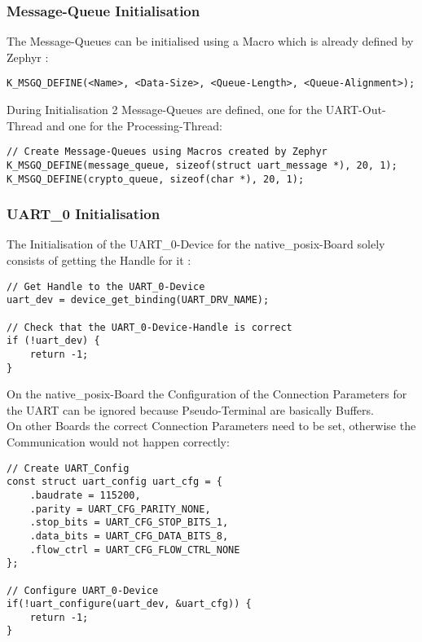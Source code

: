 \subsubsection{Message-Queue Initialisation}

The Message-Queues can be initialised using a Macro which
is already defined by Zephyr :
\\
\begin{lstlisting}[style=CStyle, caption=Message Queue Initialisation]
K_MSGQ_DEFINE(<Name>, <Data-Size>, <Queue-Length>, <Queue-Alignment>);
\end{lstlisting}
During Initialisation 2 Message-Queues are defined, one for
the UART-Out-Thread and one for the Processing-Thread:
\\
\begin{lstlisting}[style=CStyle]
// Create Message-Queues using Macros created by Zephyr
K_MSGQ_DEFINE(message_queue, sizeof(struct uart_message *), 20, 1);
K_MSGQ_DEFINE(crypto_queue, sizeof(char *), 20, 1);
\end{lstlisting}

\subsubsection{UART\_0 Initialisation}

The Initialisation of the UART\_0-Device for the native\_posix-Board
solely consists of getting the Handle for it :
\\
\begin{lstlisting}[style=CStyle,caption=UART 0 Initialisation]
// Get Handle to the UART_0-Device
uart_dev = device_get_binding(UART_DRV_NAME);

// Check that the UART_0-Device-Handle is correct
if (!uart_dev) {
	return -1;
}
\end{lstlisting}

\pagebreak

On the native\_posix-Board the Configuration of the Connection Parameters
for the UART can be ignored because Pseudo-Terminal are basically Buffers.
\\
On other Boards the correct Connection Parameters need to be set, otherwise
the Communication would not happen correctly:
\\
\begin{lstlisting}[style=CStyle, caption=UART-0 Configuration]
// Create UART_Config
const struct uart_config uart_cfg = {
	.baudrate = 115200,
	.parity = UART_CFG_PARITY_NONE,
	.stop_bits = UART_CFG_STOP_BITS_1,
	.data_bits = UART_CFG_DATA_BITS_8,
	.flow_ctrl = UART_CFG_FLOW_CTRL_NONE
};

// Configure UART_0-Device
if(!uart_configure(uart_dev, &uart_cfg)) {
	return -1;
}
\end{lstlisting}


